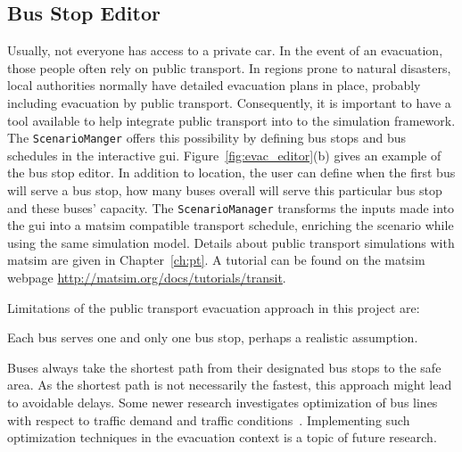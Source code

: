 \subsection{Bus Stop Editor}
Usually, not everyone has access to a private car. In the event of an evacuation, those people often rely on public transport. In regions prone to natural disasters, local authorities normally have detailed evacuation plans in place, probably including evacuation by public transport. Consequently, it is important to have a tool available to help  integrate public transport into to the simulation framework. The \lstinline|ScenarioManger| offers this possibility by defining bus stops and bus schedules in the interactive \gls{gui}. Figure~\ref{fig:evac_editor}(b) gives an example of the bus stop editor. In addition to location, the user can define when the first bus will serve a bus stop, how many buses overall will serve this particular bus stop and these buses' capacity. 
The \lstinline|ScenarioManager| transforms the inputs made into the \gls{gui} into a \gls{matsim} compatible transport schedule, enriching the scenario while using the same simulation model. Details about public transport simulations with \gls{matsim} are given in Chapter~\ref{ch:pt}. A tutorial can be found on the \gls{matsim} webpage \url{http://matsim.org/docs/tutorials/transit}.

Limitations of the public transport evacuation approach in this project are:
\begin{compactitem}
\item Each bus serves one and only one bus stop, perhaps a realistic assumption.
\item Buses always take the shortest path from their designated bus stops to the safe area. As the shortest path is not necessarily the fastest, this approach might lead to avoidable delays. Some newer research investigates optimization of bus lines with respect to traffic demand and traffic conditions~\citep{Neumann_PhDThesis_2014}. Implementing such optimization techniques in the evacuation context is a topic of future research.
\end{compactitem}

